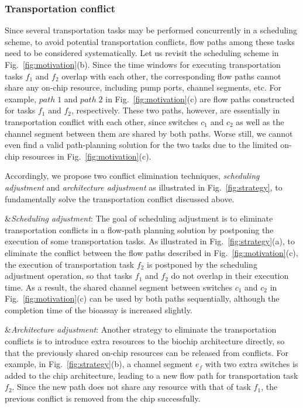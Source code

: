 \subsubsection{Transportation conflict}

Since several transportation tasks may be performed concurrently in a scheduling scheme,
to avoid potential transportation conflicts, flow paths among these tasks need to be considered systematically. Let us revisit the scheduling scheme in Fig.~\ref{fig:motivation}(b). Since the time windows for executing transportation tasks $f_1$ and $f_2$ overlap with each other, the corresponding flow paths cannot share any on-chip resource, including pump ports, channel segments, etc. For example, $path\;1$ and $path\;2$ in Fig.~\ref{fig:motivation}(c) are flow paths constructed for tasks $f_1$ and $f_2$, respectively. These two paths, however, are essentially in transportation conflict with each other, since switches $c_1$ and $c_2$ as well as the channel segment between them are shared by both paths. Worse still, we cannot even find a valid path-planning solution for the two tasks due to the limited on-chip resources in Fig.~\ref{fig:motivation}(c).

Accordingly, we propose two conflict elimination techniques, \textsl{scheduling adjustment} and \textsl{architecture adjustment} as illustrated in Fig.~\ref{fig:strategy}, to fundamentally solve the transportation conflict discussed above. %


\begin{easylist}
&\textit{Scheduling adjustment}: The goal of scheduling adjustment is to eliminate transportation conflicts in a flow-path planning solution by postponing the execution of some transportation tasks. As illustrated in Fig.~\ref{fig:strategy}(a), to eliminate the conflict between the flow paths described in Fig.~\ref{fig:motivation}(c), the execution of transportation task $f_2$ is postponed by the scheduling adjustment operation, so that tasks $f_1$ and $f_2$ do not overlap in their execution time. As a result, the shared channel segment between switches $c_1$ and $c_2$ in Fig.~\ref{fig:motivation}(c) can be used by both paths sequentially, although the completion time of the bioassay is increased slightly.

&\textit{Architecture adjustment}: Another strategy to eliminate the transportation conflicts is to introduce extra resources to the biochip architecture directly, so that the previously shared on-chip resources can be released from conflicts. For example, in Fig.~\ref{fig:strategy}(b), a channel segment $e_f$ with two extra switches is added to the chip architecture, leading to a new flow path for transportation task $f_2$. Since the new path does not share any resource with that of task $f_1$, the previous conflict is removed from the chip successfully.

\end{easylist}


